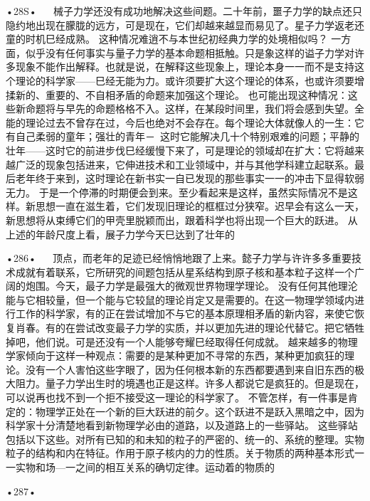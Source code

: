 •28S•
  
械子力学还没有成功地解决这些间题。二十年前，噩子力学的缺点还只隐约地出现在朦胧的远方，可是现在，它们却越来越显而易见了。星子力学返老还童的时机巳经成熟。
这种情况难逍不与本世纪初经典力学的处境相似吗？
一方面，似乎没有任何事实与量子力学的基本命题相抵触。只是象这样的谥子力学对许多现象不能作出解释。也就是说，在解释这些现象上，理论本身一一而不是支持这个理论的科学家——巳经无能为力。或许须要扩大这个理论的体系，也或许须要增揉新的、重要的、不自相矛盾的命题来加强这个理论。
也可能出现这种情况：这些新命题将与早先的命题格格不入。这样，在某段时间里，我们将会感到失望。全能的理论过去不曾存在过，今后也绝对不会存在。每个理论大体就像人的一生：它有自己柔弱的童年；强壮的青年－~这时它能解决几十个特别艰难的问题；平静的壮年——这时它的前进步伐巳经缓慢下来了，可是理论的领域却在扩大：它将越来越广泛的现象包括进来，它伸进技术和工业领域中，并与其他学科建立起联系。最后老年终于来到，这时理论在新书实一自已发现的那些事实一一的冲击下显得软弱无力。
于是一个停滞的时期便会到来。至少看起来是这样，虽然实际情况不是这样。新思想一直在滋生着，它们发现旧理论的框框过分狭窄。迟早会有这么一天，新思想将从束缚它们的甲壳里脱颖而出，跟着科学也将出现一个巨大的跃进。
从上述的年龄尺度上看，展子力学今天巳达到了壮年的

•286•
  
顶点，而老年的足迹已经悄悄地跟了上来。懿子力学与许许多多重要技术成就有着联系，它所研究的间题包括从星系结构到原子核和基本粒子这样一个广阔的炮围。今天，最子力学是最强大的微观世界物理学理论。
没有任何其他理沦能与它相较量，但一个能与它较鼠的理论肖定又是需要的。在这一物理学领域内进行工作的科学家，有的正在尝试增加不与它的基本原理相矛盾的新内容，来使它恢复肖春。有的在尝试改变最子力学的实质，并以更加先进的理论代替它。把它牺牲掉吧，他们说。可是还没有一个人能够夸耀巳经取得任何成就。
越来越多的物理学家倾向于这样一种观点：需要的是某种更加不寻常的东西，某种更加疯狂的理论。没有一个人害怕这些字眼了，因为任何根本新的东西都要遇到来自旧东西的极大阻力。量子力学出生时的境遇也正是这样。许多人都说它是疯狂的。但是现在，可以说再也找不到一个拒不接受这一理论的科学家了。
不管怎样，有一件事是肯定的：物理学正处在一个新的巨大跃进的前夕。这个跃进不是跃入黑暗之中，因为科学家十分清楚地看到新物理学必由的道路，以及道路上的一些驿站。
这些驿站包括以下这些。对所有已知的和未知的粒子的严密的、统一的、系统的整理。实物粒子的结构和内在特征。作用于原子核内的力的性质。关于物质的两种基本形式一一实物和场—一之间的相互关系的确切定律。运动着的物质的

•287•
  




